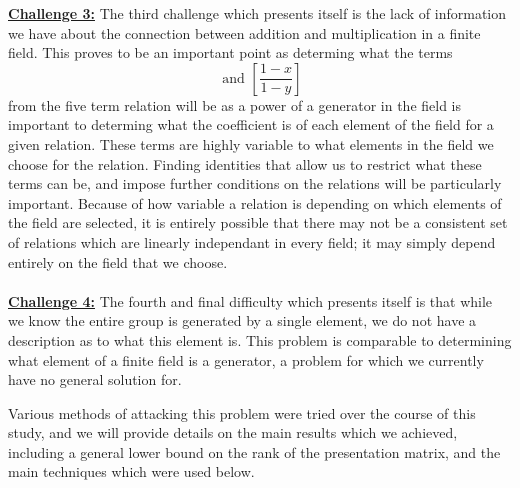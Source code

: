 \documentclass[11pt]{article}
\theoremstyle{plain}
\theoremstyle{definition}
\begin{document}
\textbf{\underline{Challenge 3:}} The third challenge which presents itself is the lack of information we have about the connection between addition and multiplication in a finite field. This proves to be an important point as determing what the terms
\begin{equation*}
[\frac{1-x^{-1}}{1-y^{-1}}] \text{ and } [\frac{1-x}{1-y}]
\end{equation*}
from the five term relation will be as a power of a generator in the field is important to determing what the coefficient is of each element of the field for a given relation. These terms are highly variable to what elements in the field we choose for the relation. Finding identities that allow us to restrict what these terms can be, and impose further conditions on the relations will be particularly important. Because of how variable a relation is depending on which elements of the field are selected, it is entirely possible that there may not be a consistent set of relations which are linearly independant in every field; it may simply depend entirely on the field that we choose. \\
\\
\textbf{\underline{Challenge 4:}} The fourth and final difficulty which presents itself is that while we know the entire group is generated by a single element, we do not have a description as to what this element is. This problem is comparable to determining what element of a finite field is a generator, a problem for which we currently have no general solution for.

Various methods of attacking this problem were tried over the course of this study, and we will provide details on the main results which we achieved, including a general lower bound on the rank of the presentation matrix, and the main techniques which were used below.
\pagebreak
\end{document}
